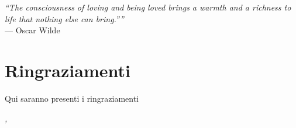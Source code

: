 
\cleardoublepage
{}
{}

\begin{flushright}{
	\slshape    
	``The consciousness of loving and being loved brings a warmth and a richness to life that nothing else can bring.”''} \\ 
	\medskip
    --- Oscar Wilde
\end{flushright}


\bigskip

\begingroup
\let\clearpage\relax
\let\cleardoublepage\relax
\let\cleardoublepage\relax

\chapter*{Ringraziamenti}
Qui saranno presenti i ringraziamenti
\bigskip

\noindent\textit{\myLocation, \myTime}
\hfill \myName

\endgroup

